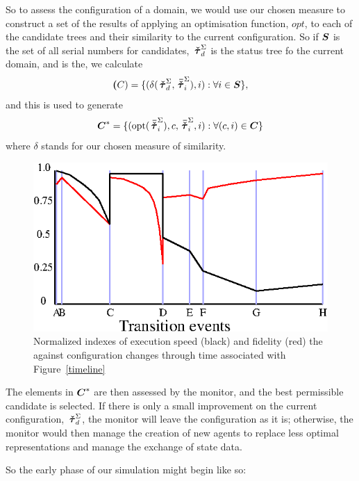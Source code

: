 So to assess the con\-fig\-ur\-a\-tion of a domain, we would use our chosen
measure to construct a set of the results of applying an optimisation
function, $opt$, to each of the candidate trees and their similarity
to the current con\-fig\-ur\-a\-tion.  So if $\boldsymbol{S}$ is the set of all
serial numbers for candidates, $\,\boldsymbol{\check{\tau}}^\Sigma_{d}$ is the status tree fo the
current domain, and  is the, we calculate
\begin{equation*}
  \boldsymbol{(}C) = \{(\delta(\,\boldsymbol{\check{\tau}}^\Sigma_{d},\,\boldsymbol{\bar{\check{\tau}}}^\Sigma_{i}),i): \forall i \in \boldsymbol{S}\},
\end{equation*}
and this is used to generate
\begin{equation*}
  \boldsymbol{C}^* = \{(\operatorname{opt}(\,\boldsymbol{\bar{\check{\tau}}}^\Sigma_{i}),c,\,\boldsymbol{\bar{\check{\tau}}}^\Sigma_{i},i): \forall(c,i) \in \boldsymbol{C}\}
\end{equation*}
where $\delta$ stands for our chosen measure of similarity.

\begin{figure}\label{indices}
\begin{center}
  \includegraphics{Figure4}
  \caption{Normalized indexes of execution speed (black) and fidelity (red) the 
    against configuration changes through time associated with Figure~\ref{timeline}}
\end{center}
\end{figure}

The elements in $\boldsymbol{C}^*$ are then assessed by the monitor, and the
best permissible candidate is selected. If there is only a small
improvement on the current con\-fig\-ur\-a\-tion, $\,\boldsymbol{\check{\tau}}^\Sigma_{d}$, the monitor will
leave the con\-fig\-ur\-a\-tion as it is; otherwise, the monitor would then manage
the creation of new agents to replace less optimal rep\-re\-sen\-ta\-tions and
manage the exchange of state data. 




So the early phase of our simulation might begin like so:

